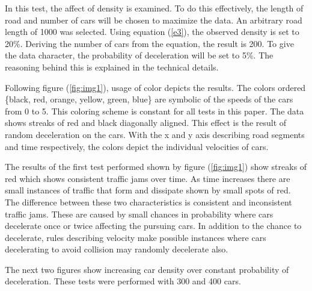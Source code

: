 \documentclass[12pt]{extarticle}
\begin{document}
In this test, the affect of density is examined. To do this effectively, the length of road and number of cars will be chosen to maximize the data. An arbitrary road length of 1000 was selected. Using equation (\ref{e3}), the observed density is set to 20\%. Deriving the number of cars from the equation, the result is 200. To give the data character, the probability of deceleration will be set to 5\%. The reasoning behind this is explained in the technical details.

Following figure (\ref{fig:img1}), usage of color depicts the results. The colors ordered \{black, red, orange, yellow, green, blue\} are symbolic of the speeds of the cars from 0 to 5. This coloring scheme is constant for all tests in this paper. The data shows streaks of red and black diagonally aligned. This effect is the result of random deceleration on the cars. With the x and y axis describing road segments and time respectively, the colors depict the individual velocities of cars.

The results of the first test performed shown by figure (\ref{fig:img1}) show streaks of red which shows consistent traffic jams over time. As time increases there are small instances of traffic that form and dissipate shown by small spots of red. The difference between these two characteristics is consistent and inconsistent traffic jams. These are caused by small chances in probability where cars decelerate once or twice affecting the pursuing cars. In addition to the chance to decelerate, rules describing velocity make possible instances where cars decelerating to avoid collision may randomly decelerate also.

The next two figures show increasing car density over constant probability of deceleration. These tests were performed with 300 and 400 cars.
\end{document}
